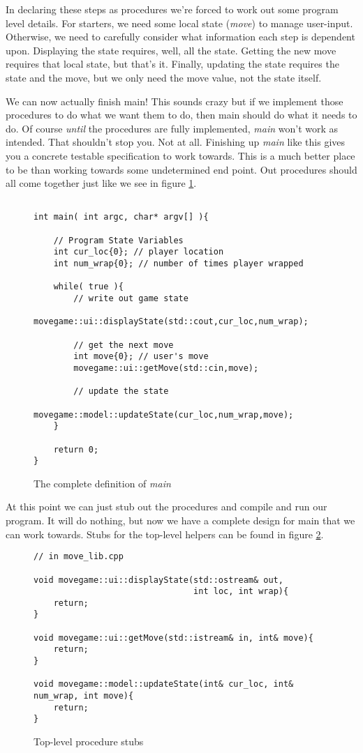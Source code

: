 \documentclass[nobib]{tufte-handout}
\begin{document}
In declaring these steps as procedures we're forced to work out some program level details. For starters, we need some local state (\textit{move}) to manage user-input. Otherwise, we need to carefully consider what information each step is dependent upon. Displaying the state requires, well, all the state. Getting the new move requires that local state, but that's it. Finally, updating the state requires the state and the move, but we only need the move value, not the state itself.

We can now actually finish main! This sounds crazy but if we implement those procedures to do what we want them to do, then main should do what it needs to do. Of course \textit{until} the procedures are fully implemented, \textit{main} won't work as intended. That shouldn't stop you. Not at all. Finishing up \textit{main} like this gives you a concrete testable specification to work towards. This is a much better place to be than working towards some undetermined end point. Out procedures should all come together just like we see in figure \ref{fig:main-final}.
\begin{figure}[!htbp]
\begin{lstlisting}

int main( int argc, char* argv[] ){

	// Program State Variables
	int cur_loc{0}; // player location
	int num_wrap{0}; // number of times player wrapped
	
	while( true ){
		// write out game state
		movegame::ui::displayState(std::cout,cur_loc,num_wrap);		

		// get the next move
		int move{0}; // user's move
		movegame::ui::getMove(std::cin,move);
		
		// update the state
		movegame::model::updateState(cur_loc,num_wrap,move);		
	}

	return 0;
}
\end{lstlisting}
\caption{The complete definition of \textit{main}}
\label{fig:main-final}
\end{figure}

At this point we can just stub out the procedures and compile and run our program. It will do nothing, but now we have a complete design for main that we can work towards. Stubs for the top-level helpers can be found in figure \ref{fig:top-stubs}.

\begin{figure}[!htbp]
\begin{lstlisting}
// in move_lib.cpp

void movegame::ui::displayState(std::ostream& out,
	                            int loc, int wrap){
	return;	                            
}	       

void movegame::ui::getMove(std::istream& in, int& move){
	return;
}
                     
void movegame::model::updateState(int& cur_loc, int& num_wrap, int move){
	return;
}
\end{lstlisting}
\caption{Top-level procedure stubs}
\label{fig:top-stubs}
\end{figure}
\end{document}
